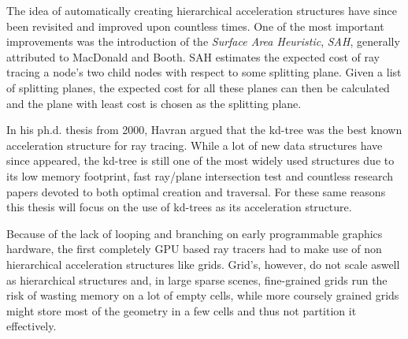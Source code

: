 
The idea of automatically creating hierarchical acceleration structures have
since been revisited and improved upon countless times. One of the most
important improvements was the introduction of the \textit{Surface Area
  Heuristic}, \textit{SAH}, generally attributed to MacDonald and
Booth. SAH estimates the expected cost of ray tracing a
node's two child nodes with respect to some splitting plane. Given a list of
splitting planes, the expected cost for all these planes can then be calculated
and the plane with least cost is chosen as the splitting plane.



In his ph.d. thesis from 2000, Havran argued that the
kd-tree was the best known acceleration structure for ray tracing. While a lot
of new data structures have since appeared, the kd-tree is still one of the most
widely used structures due to its low memory footprint, fast ray/plane
intersection test and countless research papers devoted to both optimal creation
and traversal. For these same reasons this thesis will focus on the use of
kd-trees as its acceleration structure.




Because of the lack of looping and branching on early programmable graphics
hardware, the first completely GPU based ray tracers had to make use of non
hierarchical acceleration structures like grids. Grid's,
however, do not scale aswell as hierarchical structures and, in large sparse
scenes, fine-grained grids run the risk of wasting memory on a lot of empty
cells, while more coursely grained grids might store most of the geometry in a
few cells and thus not partition it effectively.


